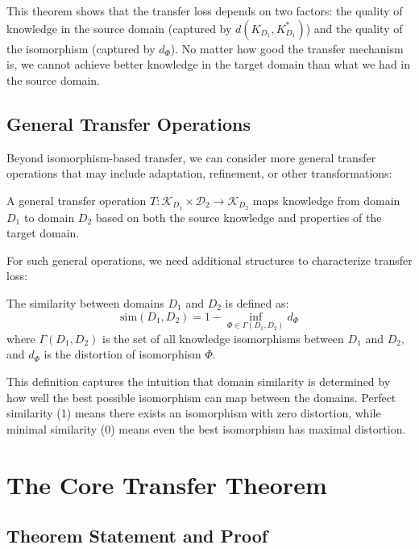 This theorem shows that the transfer loss depends on two factors: the quality of knowledge in the source domain (captured by $d(K_{D_1}, K_{D_1}^*)$) and the quality of the isomorphism (captured by $d_{\Phi}$). No matter how good the transfer mechanism is, we cannot achieve better knowledge in the target domain than what we had in the source domain.

\subsection{General Transfer Operations}

Beyond isomorphism-based transfer, we can consider more general transfer operations that may include adaptation, refinement, or other transformations:

\begin{definition}
A general transfer operation $T: \mathcal{K}_{D_1} \times \mathcal{D}_2 \to \mathcal{K}_{D_2}$ maps knowledge from domain $D_1$ to domain $D_2$ based on both the source knowledge and properties of the target domain.
\end{definition}

For such general operations, we need additional structures to characterize transfer loss:

\begin{definition}
The similarity between domains $D_1$ and $D_2$ is defined as:
\begin{equation}
\text{sim}(D_1, D_2) = 1 - \inf_{\Phi \in \Gamma(D_1, D_2)} d_{\Phi}
\end{equation}
where $\Gamma(D_1, D_2)$ is the set of all knowledge isomorphisms between $D_1$ and $D_2$, and $d_{\Phi}$ is the distortion of isomorphism $\Phi$.
\end{definition}

This definition captures the intuition that domain similarity is determined by how well the best possible isomorphism can map between the domains. Perfect similarity (1) means there exists an isomorphism with zero distortion, while minimal similarity (0) means even the best isomorphism has maximal distortion.

\section{The Core Transfer Theorem}

\subsection{Theorem Statement and Proof}

